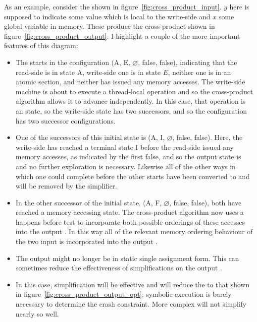As an example, consider the {\StateMachines} shown in
figure~\ref{fig:cross_product_input}.  $y$ here is supposed to
indicate some value which is local to the write-side {\StateMachine}
and $x$ some global variable in memory.  These produce the
cross-product {\StateMachine} shown in
figure~\ref{fig:cross_product_output}.  I highlight a couple of the more important
features of this diagram:

\begin{itemize}
\item The {\StateMachine} starts in the configuration (A, E,
  $\varnothing$, false, false), indicating that the read-side
  {\StateMachine} is in state A, write-side one is in state $E$,
  neither one is in an atomic section, and neither has issued any
  memory accesses.  The write-side machine is about to execute a
  thread-local operation and so the cross-product algorithm allows it
  to advance independently.  In this case, that operation is an
   state, so the write-side state has two successors, and so
  the configuration has two successor configurations.
\item One of the successors of this initial state is (A, I,
  $\varnothing$, false, false).  Here, the write-side {\StateMachine}
  has reached a terminal state I before the read-side {\StateMachine}
  issued any memory accesses, as indicated by the first false, and so
  the output state is  and no further exploration is
  necessary.  Likewise all of the other ways in which one
  {\StateMachine} could complete before the other starts have been
  converted to  and will be removed by the
  simplifier.
\item In the other successor of the initial state, (A, F,
  $\varnothing$, false, false), both {\StateMachines} have reached a
  memory accessing state.  The cross-product algorithm now uses a
  happens-before test to incorporate both possible orderings of these
  accesses into the output {\StateMachine}.  In this way all of the
  relevant memory ordering behaviour of the two input {\StateMachines}
  is incorporated into the output {\StateMachine}.
\item The output {\StateMachine} might no longer be in static single
  assignment form.  This can sometimes reduce the effectiveness of
  {\StateMachine} simplifications on the output {\StateMachine}.


\item In this case, simplification will be effective and will reduce
  the {\StateMachine} to that shown in
  figure~\ref{fig:cross_product_output_opt}; symbolic execution is
  barely necessary to determine the crash constraint.  More complex
  {\StateMachines} will not simplify nearly so well. 
\end{itemize}

